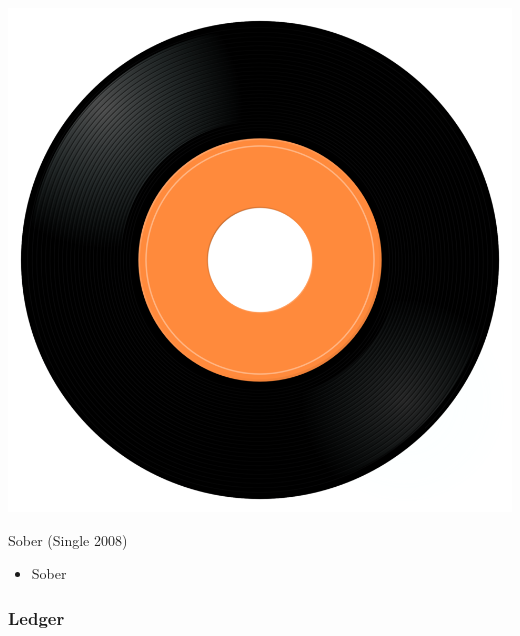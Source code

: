 \begin{minipage}[t]{0.25\textwidth}
\captionsetup{type=figure}
\includegraphics[width=\textwidth]{Images/cover.png}
\caption*{Sober (Single 2008)}
\end{minipage}
\begin{minipage}[t]{0.25\textwidth}\vspace{0pt}
\begin{itemize}[nosep,leftmargin=1em,labelwidth=*,align=left]
	\setlength{\itemsep}{0pt}
	\item Sober
\end{itemize}
\end{minipage}

\subsubsection{Ledger}

